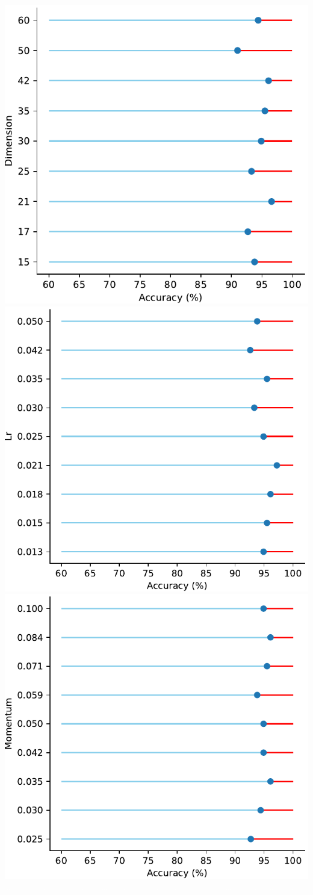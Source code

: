 \documentclass[a0,portrait]{a0poster}
\begin{document}
\includegraphics[width=.13333\linewidth]{accuracy_dimension.pdf} 
\includegraphics[width=.13333\linewidth]{accuracy_lr.pdf} 
\includegraphics[width=.13333\linewidth]{accuracy_momentum.pdf} 
\includegraphics[width=.13333\linewidth]{accuracy_epochs.pdf} 

\vspace{4cm} 
\end{document}
